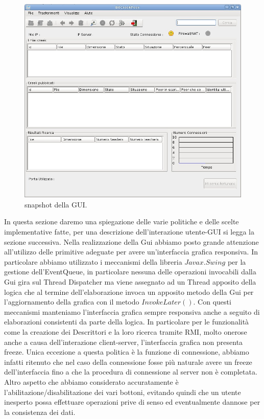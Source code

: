 \begin{figure}[h]
  \centerline{
    \mbox{\includegraphics[width=15cm]{images/GUI.jpg}}
  }
  \caption{snapshot della GUI.}
  \label{GUI}
\end{figure}

In questa sezione daremo una spiegazione delle varie politiche e delle scelte implementative fatte, per una descrizione dell'interazione utente-GUI si legga la sezione successiva.
Nella realizzazione della Gui abbiamo posto grande attenzione all'utilizzo delle primitive adeguate per avere un'interfaccia grafica responsiva.
In particolare abbiamo utilizzato i meccanismi della libreria $Javax.Swing$ per la gestione dell'EventQueue, in particolare nessuna delle operazioni invocabili dalla Gui gira sul Thread Dispatcher ma viene assegnato ad un Thread apposito della logica che al termine dell'elaborazione invoca un apposito metodo della Gui per l'aggiornamento della grafica con il metodo $InvokeLater()$.
Con questi meccanismi manteniamo l'interfaccia grafica sempre responsiva anche a seguito di elaborazioni consistenti da parte della logica. In particolare per le funzionalit\`a come la creazione dei Descrittori e la loro ricerca tramite RMI, molto onerose anche a causa dell'interazione client-server, l'interfaccia grafica non presenta freeze. Unica eccezione a questa politica \`e la funzione di connessione, abbiamo infatti ritenuto che nel caso della connessione fosse pi\`u naturale avere un freeze dell'interfaccia fino a che la procedura di connessione al server non \`e completata.
Altro aspetto che abbiamo considerato accuratamente \`e l'abilitazione/disabilitazione dei vari bottoni, evitando quindi che un utente inesperto possa effettuare operazioni prive di senso ed eventualmente dannose per la consistenza dei dati.

